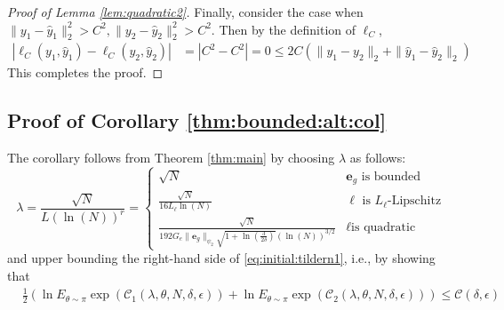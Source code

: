 \documentclass{article}
\newcommand{\e}{\mathbf{e}}
\begin{document}
\begin{proof}[Proof of Lemma \ref{lem:quadratic2}]
  Finally, consider the case when $\|y_1-\hat{y}_1\|_2^2 > C^2, \|y_2-\hat{y}_2\|_2^2 > C^2$.
  Then by the definition of $\ell_C$,
  \begin{align*}
  |\ell_C(y_1, \hat{y}_1) - \ell_C(y_2, \hat{y}_2)| &= |C^2 - C^2| = 0 \le 2C (\|y_1-y_2\|_2+\|\hat{y}_1-\hat{y}_2\|_2)
  \end{align*}
  This completes the proof.
  \end{proof}
  


  \subsection{Proof of Corollary \ref{thm:bounded:alt:col}}
  \label{sec:proof_corollary}
    The corollary follows from Theorem \ref{thm:main} by choosing $\lambda$ as follows:
    \begin{equation}
      \label{thm:bounded:alt:col:lambda}
      \lambda=\frac{\sqrt{N}}{L(\ln(N))^r} = \left\{\begin{array}{ll}
           \sqrt{N} & \e_g \mbox{ is bounded } \\
           \frac{\sqrt{N}}{16L_{\ell}\ln(N)} & \ell \mbox{ is } L_{\ell} \mbox{-Lipschitz} \\
           \frac{\sqrt{N}}{192G_e\|\e_g\|_{\psi_2}\sqrt{1+\ln\left(\frac{3}{2\delta}\right)}(\ln(N))^{3/2}} & \ell \mbox{is quadratic}
      \end{array}\right. 
    \end{equation}
    and upper bounding the right-hand side of \eqref{eq:initial:tildern1}, i.e., by showing that
    \begin{equation}
    \label{thm:bounded:alt:col:pf:eq11}
     \begin{aligned}
          & \frac{1}{2} \left(   \ln E_{\theta \sim \pi} \exp(\mathcal{C}_1(\lambda,\theta,N,\delta,\epsilon)) +
           \ln E_{\theta \sim \pi} \exp(\mathcal{C}_2(\lambda,\theta,N,\delta,\epsilon)) 
          \right)  \le 
          \mathcal{C}(\delta,\epsilon)
      \end{aligned}
    \end{equation}
    
    
    
\end{document}
